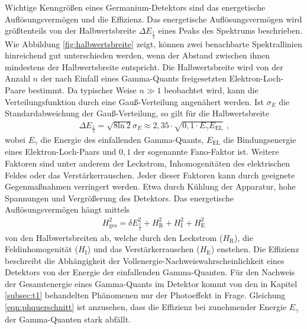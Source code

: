 Wichtige Kenngrößen eines Germanium-Detektors sind das energetische Auflösungsvermögen und die Effizienz.
Das energetische Auflösungsvermögen wird größtenteils von der Halbwertsbreite $\Delta E_{\frac{1}{2}}$ eines Peaks des Spektrums beschrieben. 
Wie Abbildung \ref{fig:halbwertsbreite} zeigt, können zwei benachbarte Spektrallinien hinreichend gut unterschieden werden, wenn der Abstand zwischen ihnen mindestens der Halbwertsbreite entspricht.
Die Halbwertsbreite wird von der Anzahl $n$ der nach Einfall eines Gamma-Quants freigesetzten Elektron-Loch-Paare bestimmt.
Da typischer Weise $n\gg 1$ beobachtet wird, kann die Verteilungsfunktion durch eine Gauß-Verteilung angenähert werden.
Ist $\sigma_E$ die Standardabweichung der Gauß-Verteilung, so gilt für die Halbwertsbreite
\begin{align}
\Delta E_{\frac{1}{2}} = \sqrt{8 \text{ln} ~2} \sigma_E \approx 2,35 \cdot \sqrt{0,1 \cdot E_{\gamma} E_{\text{EL}}} \text{ ,}
\label{eq:t:halbwertsbreite}
\end{align}
wobei $E_{\gamma}$ die Energie des einfallenden Gamma-Quants, $E_{\text{EL}}$ die Bindungsenergie eines Elektron-Loch-Paars und $0,1$ der sogenannte Fano-Faktor ist.
Weitere Faktoren sind unter anderem der Leckstrom, Inhomogenitäten des elektrischen Feldes oder das Verstärkerrauschen.
Jeder dieser Faktoren kann durch geeignete Gegenmaßnahmen verringert werden.
Etwa durch Kühlung der Apparatur, hohe Spannungen und Vergrößerung des Detektors.
Das energetische Auflösungsvermögen hängt mittels
\begin{align}
H_\text{ges}^2 = \delta E_{\frac{1}{2}}^2 + H_\text{R}^2 + H_\text{I}^2 + H_\text{E}^2
\end{align}
von den Halbwertsbreiten ab, welche durch den Leckstrom ($H_\text{R}$), die Feldinhomogenität ($H_\text{I}$) und das Verstärkerrauschen ($H_\text{E}$) enstehen.
Die Effizienz beschreibt die Abhängigkeit der Vollenergie-Nachweiswahrscheinlichkeit eines Detektors von der Energie der einfallenden Gamma-Quanten.
Für den Nachweis der Gesamtenergie eines Gamma-Quants im Detektor kommt von den in Kapitel \ref{subsec:t1} behandelten Phänomenen nur der Photoeffekt in Frage.
Gleichung \eqref{eqn:phquerschnitt} ist anzusehen, dass die Effizienz bei zunehmender Energie $E_{\gamma}$ der Gamma-Quanten stark abfällt.

